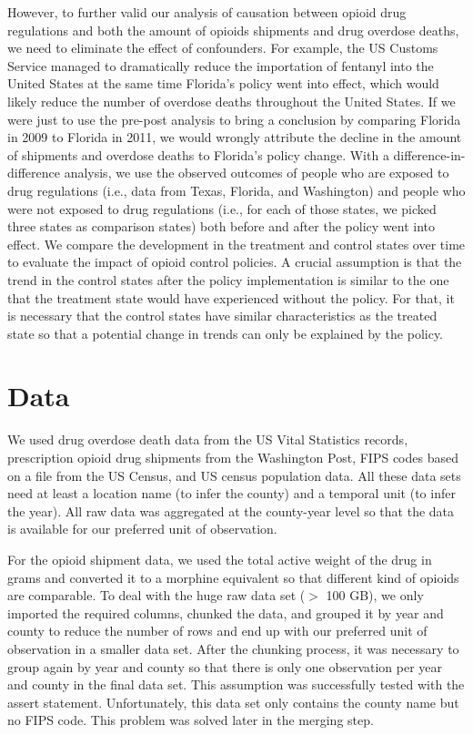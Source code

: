 \documentclass[12pt,letterpaper]{article}
\begin{document}
However, to further valid our analysis of causation between opioid drug regulations and both the amount of opioids shipments and drug overdose deaths, we need to eliminate the effect of confounders. For example, the US Customs Service managed to dramatically reduce the importation of fentanyl into the United States at the same time Florida’s policy went into effect, which would likely reduce the number of overdose deaths throughout the United States. If we were just to use the pre-post analysis to bring a conclusion by comparing Florida in 2009 to Florida in 2011, we would wrongly attribute the decline in the amount of shipments and overdose deaths to Florida’s policy change. With a difference-in-difference analysis, we use the observed outcomes of people who are exposed to drug regulations (i.e., data from Texas, Florida, and Washington) and people who were not exposed to drug regulations (i.e., for each of those states, we picked three states as comparison states) both before and after the policy went into effect. We compare the development in the treatment and control states over time to evaluate the impact of opioid control policies. A crucial assumption is that the trend in the control states after the policy implementation is similar to the one that the treatment state would have experienced without the policy. For that, it is necessary that the control states have similar characteristics as the treated state so that a potential change in trends can only be explained by the policy.

\section{Data}
We used drug overdose death data from the US Vital Statistics records, prescription opioid drug shipments from the Washington Post, FIPS codes based on a file from the US Census, and US census population data. All these data sets need at least a location name (to infer the county) and a temporal unit (to infer the year). All raw data was aggregated at the county-year level so that the data is available for our preferred unit of observation.

For the opioid shipment data, we used the total active weight of the drug in grams and converted it to a morphine equivalent so that different kind of opioids are comparable. To deal with the huge raw data set ($>$ 100 GB), we only imported the required columns, chunked the data, and grouped it by year and county to reduce the number of rows and end up with our preferred unit of observation in a smaller data set. After the chunking process, it was necessary to group again by year and county so that there is only one observation per year and county in the final data set. This assumption was successfully tested with the assert statement. Unfortunately, this data set only contains the county name but no FIPS code. This problem was solved later in the merging step.
\end{document}
